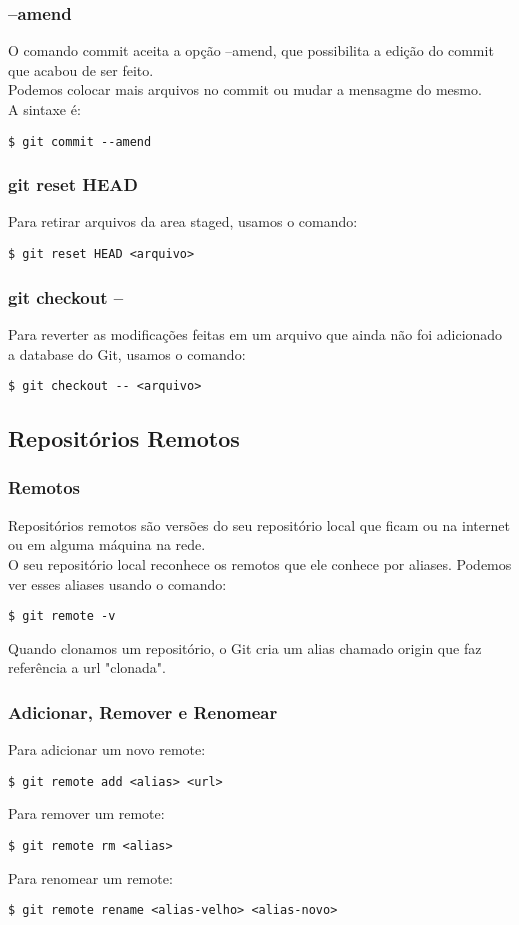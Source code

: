 \documentclass[brazil]{beamer}
\begin{document}
\begin{frame}[fragile]
  \frametitle{--amend}
  O comando commit aceita a opção --amend, que possibilita a edição do commit que acabou de ser feito. \\
  Podemos colocar mais arquivos no commit ou mudar a mensagme do mesmo. \\
  A sintaxe é:
  \begin{block}{}
    \verb#$ git commit --amend#
  \end{block}
\end{frame}

\begin{frame}[fragile]
  \frametitle{git reset HEAD}
  Para retirar arquivos da area staged, usamos o comando:
  \begin{block}{}
    \verb#$ git reset HEAD <arquivo>#
  \end{block}
\end{frame}

\begin{frame}[fragile]
  \frametitle{git checkout --}
  Para reverter as modificações feitas em um arquivo que ainda não foi adicionado a database do Git,
  usamos o comando:
  \begin{block}{}
    \verb#$ git checkout -- <arquivo>#
  \end{block}
\end{frame}

\subsection{Repositórios Remotos}

\begin{frame}[fragile]
  \frametitle{Remotos}
  Repositórios remotos são versões do seu repositório local que ficam ou na internet ou em alguma máquina 
  na rede. \\
  \pause
  O seu repositório local reconhece os remotos que ele conhece por aliases. Podemos ver esses aliases
  usando o comando:
  \begin{block}{}
    \verb#$ git remote -v#
  \end{block}
  \pause
  Quando clonamos um repositório, o Git cria um alias chamado origin que faz referência a url "clonada".
\end{frame}

\begin{frame}[fragile]
  \frametitle{Adicionar, Remover e Renomear}
  Para adicionar um novo remote:
  \begin{block}{}
    \verb#$ git remote add <alias> <url>#
  \end{block}
  \pause
  Para remover um remote:
  \begin{block}{}
    \verb#$ git remote rm <alias>#
  \end{block}
  \pause
  Para renomear um remote:
  \begin{block}{}
    \verb#$ git remote rename <alias-velho> <alias-novo>#
  \end{block}
\end{frame}
\end{document}
